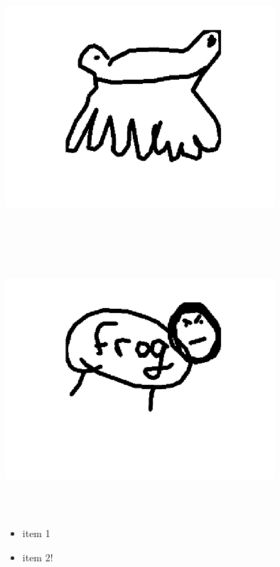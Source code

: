 \includegraphics[width=10cm,height=10cm,keepaspectratio]{figures/frog_draw_1.png}
\includegraphics[width=10cm,height=10cm,keepaspectratio]{figures/frog_draw_2.png} \begin{itemize}
\item item 1
\item item 2!
\end{itemize}



